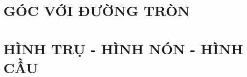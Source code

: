 \documentclass[12pt,a4paper]{book}
\theoremstyle{nonumberplain}
\begin{document}
\chapter{GÓC VỚI ĐƯỜNG TRÒN}











\chapter{HÌNH TRỤ - HÌNH NÓN - HÌNH CẦU}




	
\end{document}

